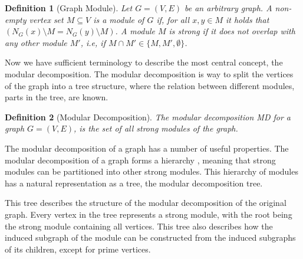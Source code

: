 \documentclass[a4paper]{article}
\newtheorem{definition}{Definition}[section]
\begin{document}
\begin{definition}[Graph Module]{\cite{Module}}
    Let $G = (V,E)$ be an arbitrary graph. A non-empty vertex set $M \subseteq V$
    is a module of $G$ if, 
    for all $x,y \in M$ it holds that  $(N_G(x) \setminus M = N_G(y) \setminus M)$. A module $M$ is
    strong if it does not overlap with any other module $M'$, i.e, if 
    $M \cap M' \in \{M,M',\emptyset \}$.
\end{definition}
  

Now we have sufficient terminology to describe the most central concept, the
modular decomposition. The modular decomposition is way to split the 
vertices of the graph into a tree structure, where the relation between
different modules, parts in the tree, are known.


\begin{definition}[Modular Decomposition]{\cite{HCL}}
    The modular decomposition MD for a graph $G =(V,E)$, is the set of all
    strong modules of the graph.
\end{definition}

The modular decomposition of a graph has a number of useful properties. The
modular decomposition of a graph forms a hierarchy , meaning that strong modules
can be partitioned into other strong modules. This hierarchy of modules has a
natural representation as a tree, the modular decomposition tree.

This tree describes the structure of the modular decomposition of the original
graph. Every vertex in the tree represents a strong module, with the root being
the strong module containing all vertices. This tree also describes how the
induced subgraph of the module can be constructed from the induced subgraphs of
its children, except for prime vertices.
\end{document}
